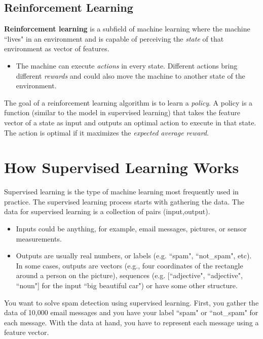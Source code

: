 \subsection{Reinforcement Learning}
\textbf{Reinforcement learning} is a subfield of machine learning where the machine ``lives" in an environment and is capable of perceiving the \textit{state} of that environment as vector of features.
\begin{itemize}
	\item The machine can execute \textit{actions} in every state. Different actions bring different \textit{rewards} and could also move the machine to another state of the environment.
\end{itemize}
The goal of a reinforcement learning algorithm is to learn a \textit{policy}. A policy is a function (similar to the model in supervised learning) that takes the feature vector of a state as input and outputs an optimal action to execute in that state. The action is optimal if it maximizes the \textit{expected average reward}.

\section{How Supervised Learning Works}
Supervised learning is the type of machine learning most frequently used in practice. The supervised learning process starts with gathering the data. The data for supervised learning is a collection of pairs (input,output).
\begin{itemize}
	\item Inputs could be anything, for example, email messages, pictures, or sensor measurements.
	\item Outputs are usually real numbers, or labels (e.g. ``spam", ``not\_spam", etc). In some cases, outputs are vectors (e.g., four coordinates of the rectangle around a person on the picture), sequences (e.g. [``adjective", ``adjective", ``noun"] for the input ``big beautiful car") or have some other structure.
\end{itemize}
You want to solve spam detection using supervised learning. First, you gather the data of 10,000 email messages and you have your label ``spam" or ``not\_spam" for each message. With the data at hand, you have to represent each message using a feature vector.

